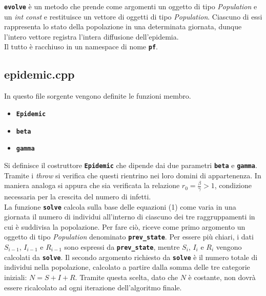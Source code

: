 \documentclass[11pt, a4paper]{article}
\begin{document}
\textbf{\texttt{evolve}} \`{e} un metodo che prende come argomenti un oggetto di tipo \textit{Population} e un \textit{int const} e restituisce un vettore di oggetti di tipo \textit{Population}. Ciascuno di essi rappresenta lo stato della popolazione in una determinata giornata, dunque l'intero vettore registra l'intera diffusione dell'epidemia.\\

Il tutto \`{e} racchiuso in un namespace di nome \textbf{\texttt{pf}}.
\subsection{epidemic.cpp}
In questo file sorgente vengono definite le funzioni membro.
\begin{itemize}
\item \textbf{\texttt{Epidemic}}
\item \textbf{\texttt{beta}}
\item \textbf{\texttt{gamma}}
\end{itemize}
 Si definisce il costruttore \textbf{\texttt{Epidemic}} che dipende dai due parametri \textbf{\texttt{beta}} e \textbf{\texttt{gamma}}. Tramite i \textit{throw} si verifica che questi rientrino nei loro domini di appartenenza. In maniera analoga si appura che sia verificata la relazione $r_0=\frac{\beta}{\gamma}>1$, condizione necessaria per la crescita del numero di infetti. \\
 
 La funzione \textbf{\texttt{solve}} calcola sulla base delle equazioni (1) come varia in una giornata il numero di individui all'interno di ciascuno dei tre raggruppamenti in cui \`{e} suddivisa la popolazione. Per fare ci\`{o}, riceve come primo argomento un oggetto di tipo \textit{Population} denominato \textbf{\texttt{prev\_state}}. Per essere pi\`{u} chiari, i dati $S_{i-1}$, $I_{i-1}$ e $R_{i-1}$ sono espressi da \textbf{\texttt{prev\_state}}, mentre $S_i$, $I_i$ e $R_i$ vengono calcolati da \textbf{\texttt{solve}}. Il secondo argomento richiesto da \textbf{\texttt{solve}} \`{e} il numero totale di individui nella popolazione, calcolato a partire dalla somma delle tre categorie iniziali: $N=S+I+R$. Tramite questa scelta, dato che $N$ \`{e} costante, non dovr\`{a} essere ricalcolato ad ogni iterazione dell'algoritmo finale. \\
 
\end{document}
